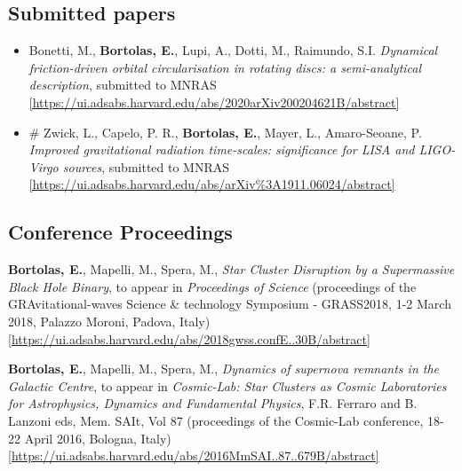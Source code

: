 \subsection*{ Submitted papers }

\begin{itemize}
\setlength\itemsep{-1pt}

\item   Bonetti, M., \textbf{Bortolas, E.}, Lupi, A., Dotti, M., Raimundo, S.I. { \it Dynamical friction-driven orbital circularisation in rotating discs: a semi-analytical description}, submitted to MNRAS \\ \href{https://ui.adsabs.harvard.edu/abs/2020arXiv200204621B/abstract}{\scriptsize [https://ui.adsabs.harvard.edu/abs/2020arXiv200204621B/abstract]}

\item  \# Zwick, L., Capelo, P. R., \textbf{Bortolas, E.}, Mayer, L., Amaro-Seoane, P. { \it Improved gravitational radiation time-scales: significance for LISA and LIGO-Virgo sources}, submitted to MNRAS \\ \href{https://ui.adsabs.harvard.edu/abs/arXiv\%3A1911.06024/abstract}{\scriptsize [https://ui.adsabs.harvard.edu/abs/arXiv\%3A1911.06024/abstract]}
\end{itemize}


\subsection*{Conference Proceedings }



\begin{etaremune}

\item {\bf Bortolas, E.}, Mapelli, M., Spera, M., {\it Star Cluster Disruption by a Supermassive Black Hole Binary}, to appear in {\it Proceedings of Science}  (proceedings of the  GRAvitational-waves Science \& technology Symposium - GRASS2018, 1-2 March 2018, Palazzo Moroni, Padova, Italy) \\ \href{https://ui.adsabs.harvard.edu/abs/2018gwss.confE..30B/abstract}{\scriptsize [https://ui.adsabs.harvard.edu/abs/2018gwss.confE..30B/abstract]}




\item {\bf Bortolas, E.}, Mapelli, M., Spera, M., {\it Dynamics of supernova remnants in the Galactic Centre}, to appear in {\it Cosmic-Lab: Star Clusters as Cosmic Laboratories for Astrophysics, Dynamics and Fundamental Physics}, F.R. Ferraro and B. Lanzoni eds, Mem. SAIt, Vol 87 (proceedings of the Cosmic-Lab conference, 18-22 April 2016, Bologna, Italy)\\ \href{https://ui.adsabs.harvard.edu/abs/2016MmSAI..87..679B/abstract}{\scriptsize [https://ui.adsabs.harvard.edu/abs/2016MmSAI..87..679B/abstract]}



\end{etaremune}

